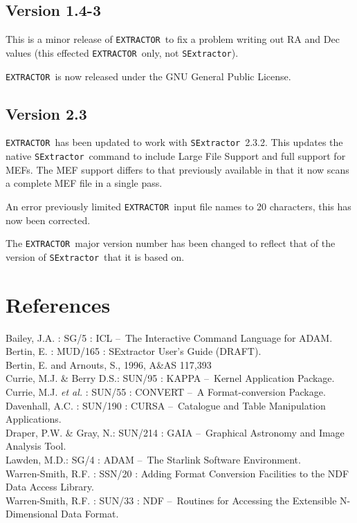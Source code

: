 \documentclass[twoside,11pt]{article}
\newcommand{\xref}[3]{#1}
\newcommand{\xlabel}[1]{}
\renewcommand{\_}{\texttt{\symbol{95}}}
\newcommand{\EXTRACTOR}{\texttt{EXTRACTOR}}
\newcommand{\SExtractor}{\texttt{SExtractor}}
\newcommand{\dash}{--}
\newcommand{\dash}{-}
\begin{document}
\subsection{Version 1.4-3}

 This is a minor release of \EXTRACTOR\ to fix a problem writing out 
 RA and Dec values (this effected \EXTRACTOR\ only, not \SExtractor).

 \EXTRACTOR\ is now released under the GNU General Public License.

\subsection{Version 2.3}

 \EXTRACTOR\ has been updated to work with \SExtractor\ 2.3.2. 
 This updates the native \SExtractor\ command to include Large File Support
 and full support for MEFs. The MEF support differs to that previously
 available in that it now scans a complete MEF file in a single pass.

 An error previously limited \EXTRACTOR\ input file names to 20 characters,
 this has now been corrected.

 The \EXTRACTOR\ major version number has been changed to reflect that of the
 version of \SExtractor\ that it is based on.


\section{\xlabel{references}References}
Bailey, J.A. : \xref{SG/5}{sg5}{} : ICL \dash\ The Interactive Command Language for ADAM.\\
Bertin, E. : MUD/165 : SExtractor User's Guide (DRAFT).\\
Bertin, E. and Arnouts, S., 1996, A\&AS 117,393\\
Currie, M.J. \& Berry D.S.: \xref{SUN/95}{sun95}{} : KAPPA \dash\ Kernel Application Package.\\
Currie, M.J. \textit{et al.} : \xref{SUN/55}{sun55}{} : CONVERT \dash\ A Format-conversion Package.\\
Davenhall, A.C. : \xref{SUN/190}{sun190}{} : CURSA \dash\ Catalogue and Table Manipulation Applications.\\
Draper, P.W. \& Gray, N.: \xref{SUN/214}{sun214}{} : GAIA \dash\ Graphical Astronomy and Image Analysis Tool.\\
Lawden, M.D.: \xref{SG/4}{sg4}{} : ADAM \dash\ The Starlink Software Environment.\\
Warren-Smith, R.F. : \xref{SSN/20}{ssn20}{} : Adding Format Conversion Facilities to the NDF Data Access Library.\\
Warren-Smith, R.F. : \xref{SUN/33}{sun33}{} : NDF \dash\ Routines for Accessing the Extensible N-Dimensional Data Format.\\
\end{document}
